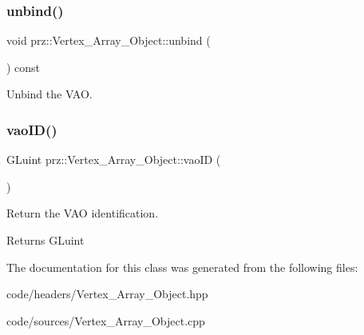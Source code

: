\subsubsection{\texorpdfstring{unbind()}{unbind()}}
{\footnotesize\ttfamily void prz\+::\+Vertex\+\_\+\+Array\+\_\+\+Object\+::unbind (\begin{DoxyParamCaption}{ }\end{DoxyParamCaption}) const\hspace{0.3cm}{\ttfamily [inline]}}



Unbind the V\+AO. 

\mbox{\label{classprz_1_1_vertex___array___object_abe38c2f93a114a1022137ef1b961d91b}} 
\subsubsection{\texorpdfstring{vaoID()}{vaoID()}}
{\footnotesize\ttfamily G\+Luint prz\+::\+Vertex\+\_\+\+Array\+\_\+\+Object\+::vao\+ID (\begin{DoxyParamCaption}{ }\end{DoxyParamCaption})\hspace{0.3cm}{\ttfamily [inline]}}



Return the V\+AO identification. 

\begin{DoxyReturn}{Returns}
G\+Luint 
\end{DoxyReturn}


The documentation for this class was generated from the following files\+:\begin{DoxyCompactItemize}
\item 
code/headers/Vertex\+\_\+\+Array\+\_\+\+Object.\+hpp\item 
code/sources/Vertex\+\_\+\+Array\+\_\+\+Object.\+cpp\end{DoxyCompactItemize}
